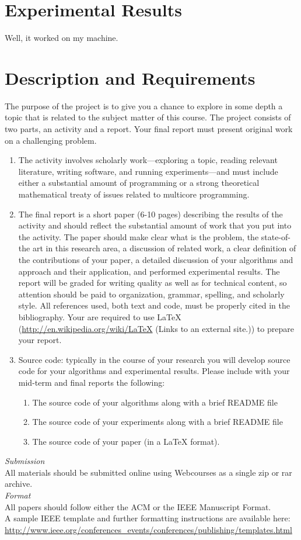 \documentclass[conference]{IEEEtran}
\begin{document}
\section{Experimental Results}
Well, it worked on my machine. 



\newpage
\section{Description and Requirements}
The purpose of the project is to give you a chance to explore in some depth a topic that is related to the subject matter of this course. The project consists of two parts, an activity and a report. Your final report must present original work on a challenging problem.
\begin{enumerate}
    \item The activity involves scholarly work—exploring a topic, reading relevant literature, writing software, and running experiments—and must include either a substantial amount of programming or a strong theoretical mathematical treaty of issues related to multicore programming.
    \item The final report is a short paper (6-10 pages) describing the results of the activity and should reflect the substantial amount of work that you put into the activity. The paper should make clear what is the problem, the state-of-the art in this research area, a discussion of related work, a clear definition of the contributions of your paper, a detailed discussion of your algorithms and approach and their application, and performed experimental results. The report will be graded for writing quality as well as for technical content, so attention should be paid to organization, grammar, spelling, and scholarly style. All references used, both text and code, must be properly cited in the bibliography. Your are required to use LaTeX (\url{http://en.wikipedia.org/wiki/LaTeX} (Links to an external site.)) to prepare your report.
    \item Source code: typically in the course of your research you will develop source code for your algorithms and experimental results. Please include with your mid-term and final reports the following:
    \begin{enumerate}
        \item The source code of your algorithms along with a brief README file
        \item The source code of your experiments along with a brief README file
        \item The source code of your paper (in a LaTeX format).
    \end{enumerate}
\end{enumerate}
\textit{Submission} \\
All materials should be submitted online using Webcourses as a single zip or rar archive. \\
\textit{Format} \\
All papers should follow either the ACM or the IEEE Manuscript Format. \\
A sample IEEE template and further formatting instructions are available here: \\
\url{http://www.ieee.org/conferences_events/conferences/publishing/templates.html}
\end{document}
